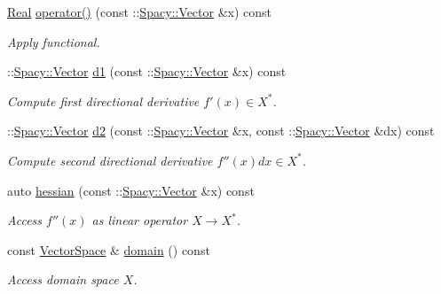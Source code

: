 \begin{DoxyCompactItemize}
\hyperlink{classSpacy_1_1Real}{Real} \hyperlink{classSpacy_1_1FEniCS_1_1C2Functional_abbf25dfc8e8c40edd3ac2dfb61030599}{operator()} (const \+::\hyperlink{classSpacy_1_1Vector}{Spacy\+::\+Vector} \&x) const 
\begin{DoxyCompactList}\small\item\em Apply functional. \end{DoxyCompactList}\item 
\+::\hyperlink{classSpacy_1_1Vector}{Spacy\+::\+Vector} \hyperlink{classSpacy_1_1FEniCS_1_1C2Functional_ab9b10dc982f81093c3125027b46c5876}{d1} (const \+::\hyperlink{classSpacy_1_1Vector}{Spacy\+::\+Vector} \&x) const 
\begin{DoxyCompactList}\small\item\em Compute first directional derivative $f'(x) \in X^* $. \end{DoxyCompactList}\item 
\+::\hyperlink{classSpacy_1_1Vector}{Spacy\+::\+Vector} \hyperlink{classSpacy_1_1FEniCS_1_1C2Functional_affc6728db99f20f57ce75f16799084b4}{d2} (const \+::\hyperlink{classSpacy_1_1Vector}{Spacy\+::\+Vector} \&x, const \+::\hyperlink{classSpacy_1_1Vector}{Spacy\+::\+Vector} \&dx) const 
\begin{DoxyCompactList}\small\item\em Compute second directional derivative $f''(x)dx\in X^* $. \end{DoxyCompactList}\item 
auto \hyperlink{classSpacy_1_1FEniCS_1_1C2Functional_aceec6783f701e121b35ffa482629e1dd}{hessian} (const \+::\hyperlink{classSpacy_1_1Vector}{Spacy\+::\+Vector} \&x) const 
\begin{DoxyCompactList}\small\item\em Access $f''(x)$ as linear operator $X\rightarrow X^*$. \end{DoxyCompactList}\item 
const \hyperlink{classSpacy_1_1VectorSpace}{Vector\+Space} \& \hyperlink{classSpacy_1_1FunctionalBase_a2d3397deb9fa1ad85ed04e37a03b3aa6}{domain} () const \hypertarget{classSpacy_1_1FunctionalBase_a2d3397deb9fa1ad85ed04e37a03b3aa6}{}\label{classSpacy_1_1FunctionalBase_a2d3397deb9fa1ad85ed04e37a03b3aa6}

\begin{DoxyCompactList}\small\item\em Access domain space $X$. \end{DoxyCompactList}\end{DoxyCompactItemize}



